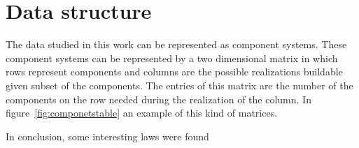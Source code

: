 \chapter{Data structure}\label{ch:structure}

The data studied in this work can be represented as component systems. These component systems can be represented by a two dimensional matrix in which rows represent components and columns are the possible realizations buildable given subset of the components. The entries of this matrix are the number of the components on the row needed during the realization of the column. In figure~\ref{fig:componetstable} an example of this kind of matrices.









In conclusion, some interesting laws were found